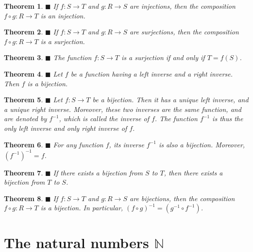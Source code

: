 \documentclass[a4paper]{article}
\newtheorem{mytheorem}{Theorem}
\numberwithin{mytheorem}{section}
\numberwithin{mydef}{section}
\numberwithin{axiom}{section}
\numberwithin{example}{section}
\newcommand{\done}{$\blacksquare$ }
\begin{document}
\begin{mytheorem} \done If $f: S \rightarrow T$ and $g: R \rightarrow S$ are injections, then the composition $f \circ g: R \rightarrow T$ is an injection.
\end{mytheorem}

\begin{mytheorem} \done If $f: S \rightarrow T$ and $g: R \rightarrow S$ are surjections, then the composition $f \circ g: R \rightarrow T$ is a surjection.
\end{mytheorem}

\begin{mytheorem} \done The function $f: S \rightarrow T$ is a surjection if and only if $T = f(S)$. \end{mytheorem}

\begin{mytheorem} \done Let $f$ be a function having a left inverse and a right inverse. Then $f$ is a bijection. \end{mytheorem}

\begin{mytheorem} \done Let $f: S \rightarrow T$ be a bijection. Then it has a unique left inverse, and a unique right inverse. Moreover, these two inverses are the same function, and are denoted by $f^{-1}$, which is called the inverse of $f$. The function $f^{-1}$ is thus the only left inverse and only right inverse of $f$. \end{mytheorem}

\begin{mytheorem} \done For any function $f$, its inverse $f^{-1}$ is also a bijection. Moreover, $(f^{-1})^{-1} = f$. \end{mytheorem}

\begin{mytheorem} \done If there exists a bijection from $S$ to $T$, then there exists a bijection from $T$ to $S$. \end{mytheorem}

\begin{mytheorem} \done If $f: S \rightarrow T$ and $g: R \rightarrow S$ are bijections, then the composition $f \circ g: R \rightarrow T$ is a bijection. In particular, $(f \circ g)^{-1} = (g^{-1} \circ f^{-1})$.
\end{mytheorem}

\section{The natural numbers $\mathbb{N}$}
\end{document}
